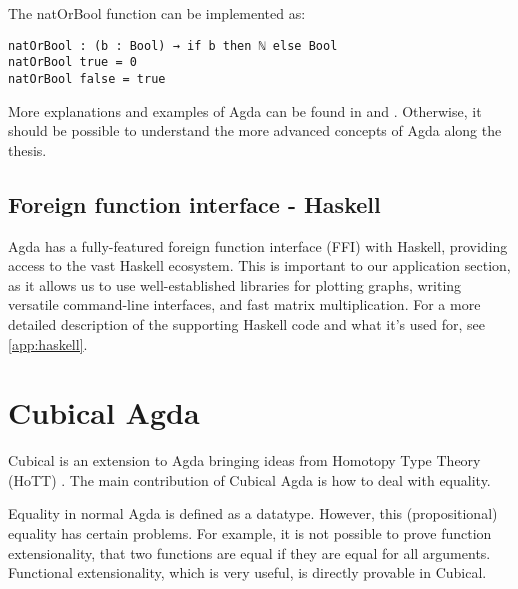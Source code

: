The natOrBool function can be implemented as:
\begin{verbatim}
natOrBool : (b : Bool) → if b then ℕ else Bool
natOrBool true = 0
natOrBool false = true
\end{verbatim}

More explanations and examples of Agda can be found in \cite{agdaWebsite} and \cite{DependentTypesAtWork}. Otherwise, it should be possible to understand the more advanced concepts of Agda along the thesis.

\subsection{Foreign function interface - Haskell}
Agda has a fully-featured foreign function interface (FFI) with Haskell, providing access to the vast Haskell ecosystem. This is important to our application section, as it allows us to use well-established libraries for plotting graphs, writing versatile command-line interfaces, and fast matrix multiplication. For a more detailed description of the supporting Haskell code and what it's used for, see \ref{app:haskell}.





\section{Cubical Agda}
Cubical \cite{cubicalAgdaDocs} is an extension to Agda bringing ideas from Homotopy Type Theory (HoTT) \cite{hottBook}. The main contribution of Cubical Agda is how to deal with equality.

Equality in normal Agda is defined as a datatype. However, this (propositional) equality has certain problems. For example, it is not possible to prove function extensionality, that two functions are equal if they are equal for all arguments. Functional extensionality, which is very useful, is directly provable in Cubical.

